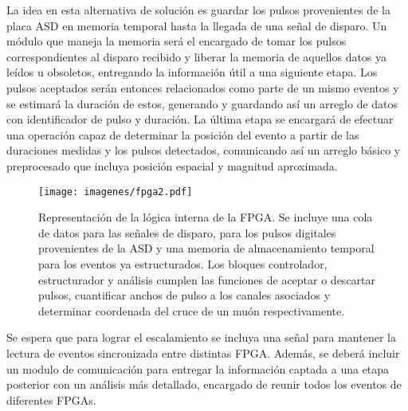 La idea en esta alternativa de solución es guardar los pulsos provenientes de la placa ASD en memoria temporal hasta la llegada de una señal de disparo. Un módulo que maneja la memoria será el encargado de tomar los pulsos correspondientes al disparo recibido y liberar la memoria de aquellos datos ya leídos u obsoletos, entregando la información útil a una siguiente etapa. Los pulsos aceptados serán entonces relacionados como parte de un mismo eventos y se estimará la duración de estos, generando y guardando así un arreglo de datos con identificador de pulso y duración. La última etapa se encargará de efectuar una operación capaz de determinar la posición del evento a partir de las duraciones medidas y los pulsos detectados, comunicando así un arreglo básico y preprocesado que incluya posición espacial y magnitud aproximada.


\begin{figure}[H]
	\centering
	\texttt{[image: imagenes/fpga2.pdf]}
	\caption{Representación de la lógica interna de la FPGA. Se incluye una cola de datos para las señales de disparo, para los pulsos digitales provenientes de la ASD y una memoria de almacenamiento temporal para los eventos ya estructurados. Los bloques controlador, estructurador y análisis cumplen las funciones de aceptar o descartar pulsos, cuantificar anchos de pulso a  los canales asociados y determinar coordenada del cruce de un muón respectivamente.}
	\label{fig:fpga2}
\end{figure}

Se espera que para lograr el escalamiento se incluya una señal para mantener la lectura de eventos sincronizada entre distintas FPGA. Además, se deberá incluir un modulo de comunicación para entregar la información captada a una etapa posterior con un análisis más detallado, encargado de reunir todos los eventos de diferentes FPGAs.


